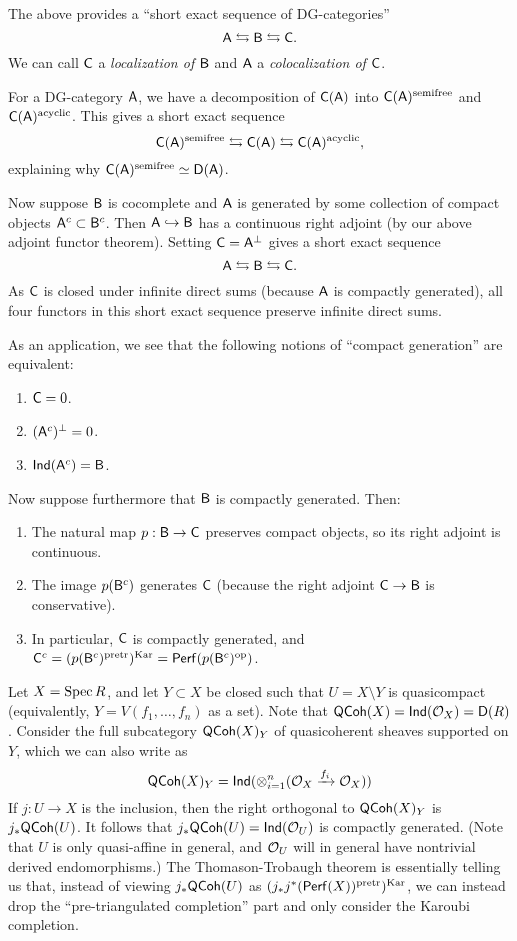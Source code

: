 \documentclass{amsart}
\begin{document}
The above provides a ``short exact sequence of DG-categories''
\[
	\mathsf{A} \leftrightarrows \mathsf{B} \leftrightarrows \mathsf{C}.
\]
We can call $\mathsf{C}$ a \emph{localization of $\mathsf{B}$} and $\mathsf{A}$ a \emph{colocalization of $\mathsf{C}$}.

\begin{ex}
	For a DG-category $\mathsf{A}$, we have a decomposition of $\mathsf{C}(\mathsf{A})$ into $\mathsf{C}(\mathsf{A})^{\mathrm{semifree}}$ and $\mathsf{C}(\mathsf{A})^{\mathrm{acyclic}}$.
	This gives a short exact sequence
	\[
		\mathsf{C}(\mathsf{A})^{\mathrm{semifree}} \leftrightarrows \mathsf{C}(\mathsf{A}) \leftrightarrows \mathsf{C}(\mathsf{A})^{\mathrm{acyclic}},
	\]
	explaining why $\mathsf{C}(\mathsf{A})^{\mathrm{semifree}} \simeq \mathsf{D}(\mathsf{A})$.
\end{ex}

Now suppose $\mathsf{B}$ is cocomplete and $\mathsf{A}$ is generated by some collection of compact objects $\mathsf{A}^c \subset \mathsf{B}^c$.
Then $\mathsf{A} \hookrightarrow \mathsf{B}$ has a continuous right adjoint (by our above adjoint functor theorem).
Setting $\mathsf{C} = \mathsf{A}^\perp$ gives a short exact sequence
\[
	\mathsf{A} \leftrightarrows \mathsf{B} \leftrightarrows \mathsf{C}.
\]
As $\mathsf{C}$ is closed under infinite direct sums (because $\mathsf{A}$ is compactly generated), all four functors in this short exact sequence preserve infinite direct sums.

As an application, we see that the following notions of ``compact generation'' are equivalent:
\begin{enumerate}
	\item $\mathsf{C} = 0$.
	\item $(\mathsf{A}^c)^\perp = 0$.
	\item $\mathsf{Ind}(\mathsf{A}^c) = \mathsf{B}$.
\end{enumerate}

Now suppose furthermore that $\mathsf{B}$ is compactly generated.
Then:
\begin{enumerate}
	\item The natural map $p: \mathsf{B} \to \mathsf{C}$ preserves compact objects, so its right adjoint is continuous.
	\item The image $p(\mathsf{B}^c)$ generates $\mathsf{C}$ (because the right adjoint $\mathsf{C} \to \mathsf{B}$ is conservative).
	\item In particular, $\mathsf{C}$ is compactly generated, and $\mathsf{C}^c = (p(\mathsf{B}^c)^{\mathrm{pretr}})^{\mathrm{Kar}} = \mathsf{Perf}(p(\mathsf{B}^c)^{\mathrm{op}})$.
\end{enumerate}

\begin{ex}
	Let $X = \operatorname{Spec} R$, and let $Y \subset X$ be closed such that $U = X \setminus Y$ is quasicompact (equivalently, $Y = V(f_1, \dots, f_n)$ as a set).
	Note that $\mathsf{QCoh}(X) = \mathsf{Ind}(\mathcal{O}_X) = \mathsf{D}(R)$.
	Consider the full subcategory $\mathsf{QCoh}(X)_Y$ of quasicoherent sheaves supported on $Y$, which we can also write as
	\[
		\mathsf{QCoh}(X)_Y = \mathsf{Ind}(\otimes_{i=1}^n (\mathcal{O}_X \xrightarrow{f_i} \mathcal{O}_X))
	\]
	If $j: U \to X$ is the inclusion, then the right orthogonal to $\mathsf{QCoh}(X)_Y$ is $j_* \mathsf{QCoh}(U)$.
	It follows that $j_* \mathsf{QCoh}(U) = \mathsf{Ind}(\mathcal{O}_U)$ is compactly generated.
	(Note that $U$ is only quasi-affine in general, and $\mathcal{O}_U$ will in general have nontrivial derived endomorphisms.)
	The Thomason-Trobaugh theorem is essentially telling us that, instead of viewing $j_* \mathsf{QCoh}(U)$ as $(j_* j^*(\mathsf{Perf}(X))^{\mathrm{pretr}})^{\mathrm{Kar}}$, we can instead drop the ``pre-triangulated completion'' part and only consider the Karoubi completion.
\end{ex}
\end{document}
